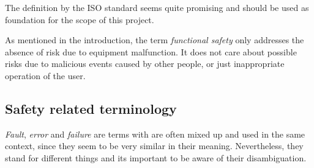 The definition by the ISO standard seems quite promising and should be used as foundation for the scope of this project.

As mentioned in the introduction, the term \emph{functional safety} only addresses the absence of risk due to equipment malfunction. It does not care about possible risks due to malicious events caused by other people, or just inappropriate operation of the user.


\subsection{Safety related terminology}

\label{sec:fault,error,failure}
\emph{Fault}, \emph{error} and \emph{failure} are terms with are often mixed up and used in the same context, since they seem to be very similar in their meaning. Nevertheless, they stand for different things and its important to be aware of their disambiguation.


